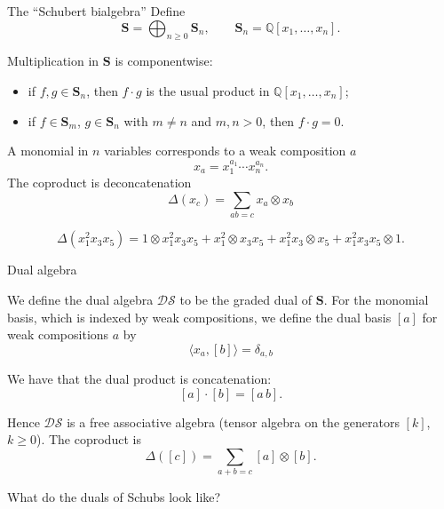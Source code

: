 \documentclass[aspectratio=169]{beamer}
\newcommand{\coma}{\mathbf{S}}
\newcommand{\dcoma}{\mathcal{DS}}
\newcommand{\wb}[1]{\left[#1\right]}
\begin{document}
\begin{frame}{The ``Schubert bialgebra''}
Define
\[
\coma = \bigoplus_{n\ge 0} \coma_n,
\qquad \coma_n = \mathbb{Q}[x_1,\dots,x_n].
\]

Multiplication in $\coma$ is componentwise:
\begin{itemize}
  \item if $f,g\in \coma_n$, then $f\cdot g$ is the usual product in $\mathbb{Q}[x_1,\dots,x_n]$;
  \item if $f\in \coma_m$, $g\in \coma_n$ with $m\neq n$ and $m,n>0$, then $f\cdot g=0$.
\end{itemize}

A monomial in $n$ variables corresponds to a weak composition $a$
$$x_a = x_1^{a_1}\cdots x_n^{a_n}.$$
The coproduct is deconcatenation
\[\Delta(x_c) = \sum_{ab = c} x_a \otimes x_b\]


$$\Delta(x_1^2x_3x_5) = 1\otimes x_1^2x_3x_5 + x_1^2\otimes x_3x_5 + x_1^2x_3\otimes x_5 + x_1^2x_3x_5\otimes 1.$$
\end{frame}

\begin{frame}{Dual algebra}

We define the dual algebra $\dcoma$ to be the graded dual of $\coma$. For the monomial basis, which is indexed by weak compositions, we define the dual basis $[a]$ for weak compositions $a$ by 
$$\langle x_a, [b]\rangle = \delta_{a,b}$$

We have that the dual product is concatenation:
\[
\wb{a}\cdot \wb{b} = \wb{a\,b}.
\]

Hence $\dcoma$ is a free associative algebra (tensor algebra on the generators $\wb{k}$, $k\ge 0$). The coproduct is
\[\Delta(\wb{c}) = \sum_{a + b=c} \wb{a} \otimes \wb{b}.\]

What do the duals of Schubs look like?
\end{frame}
\end{document}
